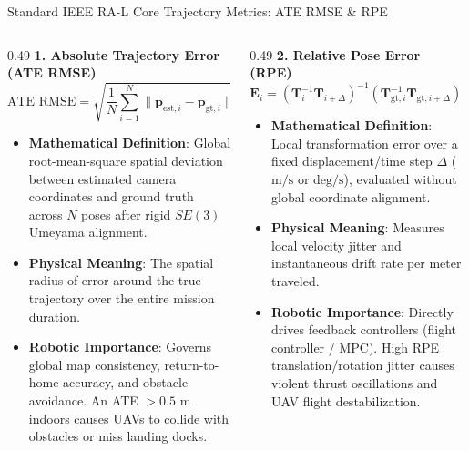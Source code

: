 \documentclass[aspectratio=169, 10pt]{beamer}
\begin{document}
\begin{frame}{Standard IEEE RA-L Core Trajectory Metrics: ATE RMSE \& RPE}
  \begin{columns}[T]
    \begin{column}{0.49\textwidth}
      {\small \textbf{\textcolor{NavyBlue}{1. Absolute Trajectory Error (ATE RMSE)}}}
      \begin{equation}
        \text{ATE RMSE} = \sqrt{\frac{1}{N} \sum_{i=1}^N \|\mathbf{p}_{\text{est}, i} - \mathbf{p}_{\text{gt}, i}\|^2}
      \end{equation}
      \scriptsize
      \begin{itemize}
        \setlength{\itemsep}{2pt}
        \item \textbf{Mathematical Definition}: Global root-mean-square spatial deviation between estimated camera coordinates and ground truth across $N$ poses after rigid $SE(3)$ Umeyama alignment.
        \item \textbf{Physical Meaning}: The spatial radius of error around the true trajectory over the entire mission duration.
        \item \textbf{Robotic Importance}: Governs global map consistency, return-to-home accuracy, and obstacle avoidance. An ATE $> 0.5\text{ m}$ indoors causes UAVs to collide with obstacles or miss landing docks.
      \end{itemize}
    \end{column}

    \begin{column}{0.49\textwidth}
      {\small \textbf{\textcolor{NavyBlue}{2. Relative Pose Error (RPE)}}}
      \begin{equation}
        \mathbf{E}_i = (\mathbf{T}_i^{-1} \mathbf{T}_{i+\Delta})^{-1} (\mathbf{T}_{\text{gt},i}^{-1} \mathbf{T}_{\text{gt},i+\Delta}) \in SE(3)
      \end{equation}
      \scriptsize
      \begin{itemize}
        \setlength{\itemsep}{2pt}
        \item \textbf{Mathematical Definition}: Local transformation error over a fixed displacement/time step $\Delta$ ($\text{m/s}$ or $\text{deg/s}$), evaluated without global coordinate alignment.
        \item \textbf{Physical Meaning}: Measures local velocity jitter and instantaneous drift rate per meter traveled.
        \item \textbf{Robotic Importance}: Directly drives feedback controllers (flight controller / MPC). High RPE translation/rotation jitter causes violent thrust oscillations and UAV flight destabilization.
      \end{itemize}
    \end{column}
  \end{columns}
\end{frame}
\end{document}
